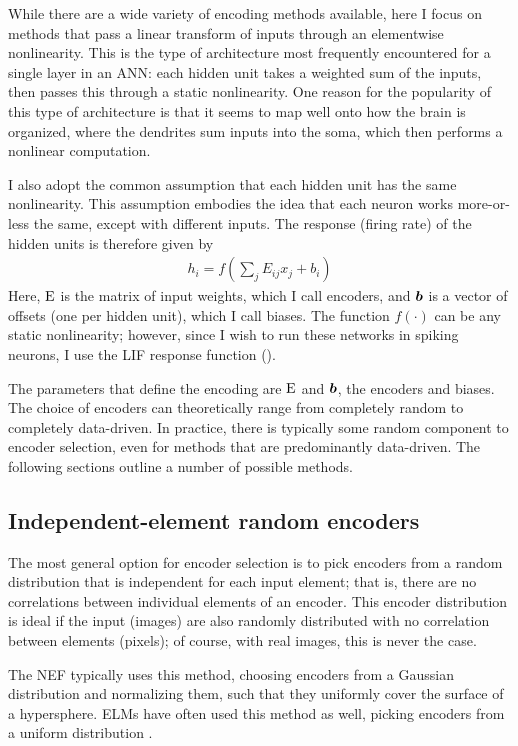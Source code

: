 While there are a wide variety of encoding methods available,
here I focus on methods that pass a linear transform of inputs
through an elementwise nonlinearity.
This is the type of architecture most frequently encountered
for a single layer in an ANN:
each hidden unit takes a weighted sum of the inputs,
then passes this through a static nonlinearity.
One reason for the popularity of this type of architecture
is that it seems to map well onto how the brain is organized,
where the dendrites sum inputs into the soma,
which then performs a nonlinear computation.

I also adopt the common assumption that each hidden unit
has the same nonlinearity.
This assumption embodies the idea that each neuron works more-or-less the same,
except with different inputs.
The response (firing rate) of the hidden units is therefore given by
\begin{align}
  h_i = f\left(\sum_j E_{ij} x_j + b_i\right)
\end{align}
Here, $\mathrm{E}$ is the matrix of input weights, which I call encoders,
and $\boldsymbol{b}$ is a vector of offsets (one per hidden unit), which I call biases.
The function $f(\cdot)$ can be any static nonlinearity;
however, since I wish to run these networks in spiking neurons,
I use the LIF response function ().

The parameters that define the encoding are $\mathrm{E}$ and $\boldsymbol{b}$,
the encoders and biases.
The choice of encoders can theoretically range from completely random
to completely data-driven.
In practice, there is typically some random component to encoder selection,
even for methods that are predominantly data-driven.
The following sections outline a number of possible methods.


\subsection{Independent-element random encoders}

The most general option for encoder selection is to pick encoders
from a random distribution that is independent for each input element;
that is, there are no correlations between individual elements of an encoder.
This encoder distribution is ideal if the input (images)
are also randomly distributed with no correlation between elements (pixels);
of course, with real images, this is never the case.

The NEF typically uses this method,
choosing encoders from a Gaussian distribution and normalizing them,
such that they uniformly cover the surface of a hypersphere.
ELMs have often used this method as well,
picking encoders from a uniform distribution \parencite{Huang2012}.


